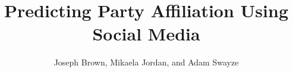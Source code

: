 \documentclass[final]{beamer}
\title{Predicting Party Affiliation Using Social Media} %
\author{Joseph Brown, Mikaela Jordan, and Adam Swayze} %
\institute{Tarleton State University} %
\newlength{\sepwid}
\newlength{\onecolwid}
\begin{document}

\setlength{\belowcaptionskip}{2ex} %
\setlength\belowdisplayshortskip{2ex} %

\begin{frame}[t] %

\begin{columns}[t] %

\begin{column}{\sepwid}\end{column} %

\begin{column}{\onecolwid} %


%
%



\end{column}
\end{columns}
\end{frame}
\end{document}

